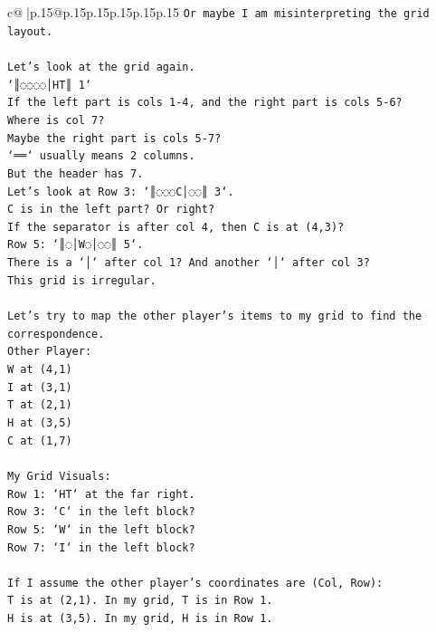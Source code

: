 \documentclass{article}
\begin{document}
{\begin{supertabular}{c@{$\;$}|p{.15\linewidth}@{}p{.15\linewidth}p{.15\linewidth}p{.15\linewidth}p{.15\linewidth}p{.15\linewidth}}
{{{\texttt{Or maybe I am misinterpreting the grid layout.} \\
\\ 
\texttt{Let's look at the grid again.} \\
\texttt{`║◌◌◌◌│HT║ 1`} \\
\texttt{If the left part is cols 1{-}4, and the right part is cols 5{-}6?} \\
\texttt{Where is col 7?} \\
\texttt{Maybe the right part is cols 5{-}7?} \\
\texttt{`══` usually means 2 columns.} \\
\texttt{But the header has 7.} \\
\texttt{Let's look at Row 3: `║◌◌◌C│◌◌║ 3`.} \\
\texttt{C is in the left part? Or right?} \\
\texttt{If the separator is after col 4, then C is at (4,3)?} \\
\texttt{Row 5: `║◌│W◌│◌◌║ 5`.} \\
\texttt{There is a `│` after col 1? And another `│` after col 3?} \\
\texttt{This grid is irregular.} \\
\\ 
\texttt{Let's try to map the other player's items to my grid to find the correspondence.} \\
\texttt{Other Player:} \\
\texttt{W at (4,1)} \\
\texttt{I at (3,1)} \\
\texttt{T at (2,1)} \\
\texttt{H at (3,5)} \\
\texttt{C at (1,7)} \\
\\ 
\texttt{My Grid Visuals:} \\
\texttt{Row 1: `HT` at the far right.} \\
\texttt{Row 3: `C` in the left block?} \\
\texttt{Row 5: `W` in the left block?} \\
\texttt{Row 7: `I` in the left block?} \\
\\ 
\texttt{If I assume the other player's coordinates are (Col, Row):} \\
\texttt{T is at (2,1). In my grid, T is in Row 1.} \\
\texttt{H is at (3,5). In my grid, H is in Row 1.} \\
}}}
\end{supertabular}}
\end{document}
